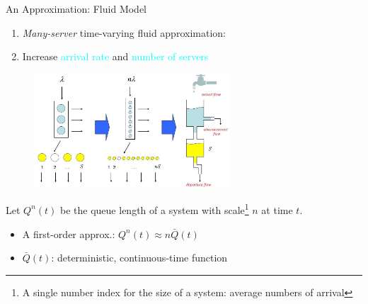 \documentclass[smaller ,table,usenames,dvipsnames]{beamer}
\newcommand{\?}{\stackrel{?}{=}}
\begin{document}
\begin{frame}{An Approximation: Fluid Model}
\begin{enumerate}
	\item \textit{Many-server} time-varying fluid approximation: \cite{liu2012g,mandelbaum1998strong} \item Increase \textcolor{Cyan}{arrival rate} and \textcolor{Cyan}{number of servers}

\end{enumerate}
\vspace*{-0.2in}
\begin{figure}[ht]
	\centering
	\includegraphics[width=0.65\textwidth]{./Figures/fluid3}
\end{figure}
\vspace*{-0.1in}
Let $ Q^n(t) $ be the queue length of a system with scale\footnote{A single number index for the size of a system: average numbers of arrival} $ n $ at time $ t $. 
\begin{itemize}
	\item A first-order approx.: $ Q^n(t)\approx n\bar{Q}(t) $
	\item $ \bar{Q}(t) $: deterministic, continuous-time function
\end{itemize}
\end{frame}
\end{document}

